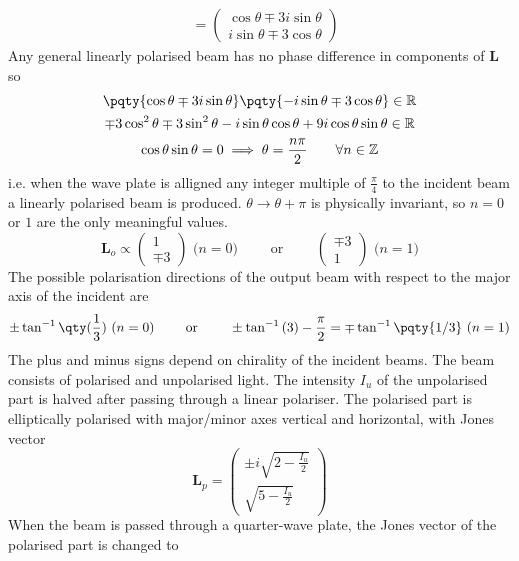 \documentclass[12pt]{extarticle}
\renewcommand{\bf}{\mathbf}
\begin{document}
\begin{outline}[enumerate]
\begin{align*}
            &= \begin{pmatrix} \cos \theta \mp 3i \sin \theta \\ i\sin\theta\mp 3\cos \theta  \end{pmatrix} 
        \end{align*}
        Any general linearly polarised beam has no phase difference in components of \(\bf L\) so 
        \begin{gather*}
            \pqty{\cos \theta \mp 3i\sin\theta }\pqty{ - i\sin\theta \mp 3\cos \theta }\in \mathbb{R}\\
            \mp 3 \cos^2 \theta  \mp 3\sin^2\theta-i\sin\theta \cos\theta + 9i\cos\theta \sin\theta  \in \mathbb{R}\\
            \cos\theta \sin\theta = 0\implies \theta = \frac{n\pi}{2} \qquad\forall n \in \mathbb{Z}
        \end{gather*}
        i.e. when the wave plate is alligned any integer multiple of \(\frac{\pi}{4}\) to the incident beam a linearly polarised beam is produced. \(\theta \to \theta + \pi\) is physically invariant, so \(n = 0\) or \(1\) are the only meaningful values.
        \[
            \bf L_o \propto \begin{pmatrix} 1\\ \mp 3 \end{pmatrix} \text{ (\(n=0\))} \qquad\text{ or }\qquad \begin{pmatrix} \mp 3\\1 \end{pmatrix}\text{ (\(n = 1\))}
        \]
        The possible polarisation directions of the output beam with respect to the major axis of the incident are 
        \[
            \pm\tan^{-1}\qty(\frac{1}{3})\text{ (\(n=0\))} \qquad\text{ or }\qquad \pm \tan^{-1}{(3)} - \frac{\pi}{2} =\mp \tan^{-1}\pqty{1/3}\text{ (\(n=1\))}
        \]
        The plus and minus signs depend on chirality of the incident beams.
        \1 The beam consists of polarised and unpolarised light. The intensity \(I_u\) of the unpolarised part is halved after passing through a linear polariser. The polarised part is elliptically polarised with major/minor axes vertical and horizontal, with Jones vector
        \[
            \bf L_p = \begin{pmatrix} \pm i\sqrt{2 - \frac{I_u}{2}}\\ \sqrt{5 - \frac{I_u}{2}} \end{pmatrix} 
        \]
        When the beam is passed through a quarter-wave plate, the Jones vector of the polarised part is changed to

\end{outline}
\end{document}
